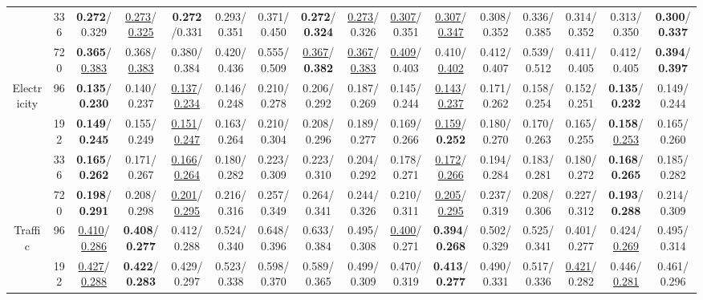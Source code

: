 \begin{table}[t]
{\begin{tabular}{@{}cc@{\hspace{5pt}}*{7}{c}@{\hspace{8pt}}*{7}{c}@{}}
 & 336 & \textbf{0.272}/0.329 & \uline{0.273}/\uline{0.325} & \textbf{0.272}/0.331 & 0.293/0.351 & 0.371/0.450 & \textbf{0.272}/\textbf{0.324} & \uline{0.273}/0.326 & \uline{0.307}/0.351 & \uline{0.307}/\uline{0.347} & 0.308/0.352 & 0.336/0.385 & 0.314/0.352 & 0.313/0.350 & \textbf{0.300}/\textbf{0.337} \\
 & 720 & \textbf{0.365}/\uline{0.383} & 0.368/\uline{0.383} & 0.380/0.384 & 0.420/0.436 & 0.555/0.509 & \uline{0.367}/\textbf{0.382} & \uline{0.367}/\uline{0.383} & \uline{0.409}/0.403 & 0.410/\uline{0.402} & 0.412/0.407 & 0.539/0.512 & 0.411/0.405 & 0.412/0.405 & \textbf{0.394}/\textbf{0.397} \\
\midrule
\multirow{4}{*}{Electricity} & 96 & \textbf{0.135}/\textbf{0.230} & 0.140/0.237 & \uline{0.137}/\uline{0.234} & 0.146/0.248 & 0.210/0.278 & 0.206/0.292 & 0.187/0.269 & 0.145/0.244 & \uline{0.143}/\uline{0.237} & 0.171/0.262 & 0.158/0.254 & 0.152/0.251 & \textbf{0.135}/\textbf{0.232} & 0.149/0.244 \\
 & 192 & \textbf{0.149}/\textbf{0.245} & 0.155/0.249 & \uline{0.151}/\uline{0.247} & 0.163/0.264 & 0.210/0.304 & 0.208/0.296 & 0.189/0.277 & 0.169/0.266 & \uline{0.159}/\textbf{0.252} & 0.180/0.270 & 0.170/0.263 & 0.165/0.255 & \textbf{0.158}/\uline{0.253} & 0.165/0.260 \\
 & 336 & \textbf{0.165}/\textbf{0.262} & 0.171/0.267 & \uline{0.166}/\uline{0.264} & 0.180/0.282 & 0.223/0.309 & 0.223/0.310 & 0.204/0.292 & 0.178/0.271 & \uline{0.172}/\uline{0.266} & 0.194/0.284 & 0.183/0.281 & 0.180/0.272 & \textbf{0.168}/\textbf{0.265} & 0.185/0.282 \\
 & 720 & \textbf{0.198}/\textbf{0.291} & 0.208/0.298 & \uline{0.201}/\uline{0.295} & 0.216/0.316 & 0.257/0.349 & 0.264/0.341 & 0.244/0.326 & 0.210/0.311 & \uline{0.205}/\uline{0.295} & 0.237/0.319 & 0.208/0.306 & 0.227/0.312 & \textbf{0.193}/\textbf{0.288} & 0.214/0.309 \\
\midrule
\multirow{4}{*}{Traffic} & 96 & \uline{0.410}/\uline{0.286} & \textbf{0.408}/\textbf{0.277} & 0.412/0.288 & 0.524/0.340 & 0.648/0.396 & 0.633/0.384 & 0.495/0.308 & \uline{0.400}/0.271 & \textbf{0.394}/\textbf{0.268} & 0.502/0.329 & 0.525/0.341 & 0.401/0.277 & 0.424/\uline{0.269} & 0.495/0.314 \\
 & 192 & \uline{0.427}/\uline{0.288} & \textbf{0.422}/\textbf{0.283} & 0.429/0.297 & 0.523/0.338 & 0.598/0.370 & 0.589/0.365 & 0.499/0.309 & 0.470/0.319 & \textbf{0.413}/\textbf{0.277} & 0.490/0.331 & 0.517/0.336 & \uline{0.421}/0.282 & 0.446/\uline{0.281} & 0.461/0.296 \\

\end{tabular}}
\end{table}
